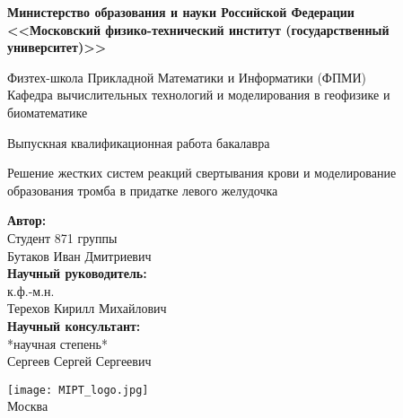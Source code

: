 \begin{center}
    \large\textbf{Министерство образования и науки Российской Федерации \\
    <<Московский физико-технический институт (государственный
    университет)>>} \\
    \vspace{1cm}

    Физтех-школа Прикладной Математики и Информатики (ФПМИ) \\

    Кафедра вычислительных технологий и моделирования в геофизике и биоматематике \\

    \vspace{3em}

    Выпускная квалификационная работа бакалавра
\end{center}

\begin{center}
    \vspace{\fill}
    \LARGE{Решение жестких систем реакций свертывания крови и моделирование образования тромба в придатке левого желудочка}

    \vspace{\fill}
\end{center}


\begin{flushright}
    \textbf{Автор:} \\
    Студент 871 группы \\
    Бутаков Иван Дмитриевич \\
    \vspace{2em}
    \textbf{Научный руководитель:} \\
    к.ф.-м.н. \\
    Терехов Кирилл Михайлович \\
    \vspace{2em}
    \textbf{Научный консультант:} \\
    *научная степень* \\
    Сергеев Сергей Сергеевич \\
\end{flushright}

\vspace{7em}

\begin{center}
    \texttt{[image: MIPT\_logo.jpg]}\\
    Москва \the\year{}
\end{center}

\thispagestyle{empty}

\newpage
\setcounter{page}{2}
\fancyfoot[c]{\thepage}
\fancyhead[R]{}
